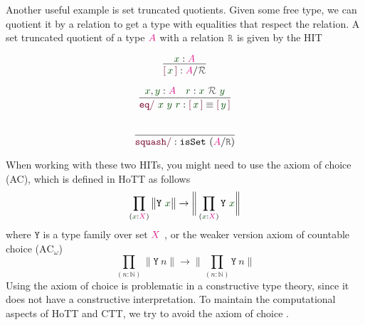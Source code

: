 \documentclass[twoside,11pt,openright]{report}
\theoremstyle{plain} %
\theoremstyle{definition}
\theoremstyle{remark}
\newcommand*{\term}[1]{\textcolor{green!30!black}{#1}} %
\newcommand*{\type}[1]{\textcolor{magenta!90!black}{#1}}
\newcommand*{\relation}[1]{\textcolor{gray!75!black}{\ensuremath{\mathtt{#1}}}}
\newcommand*{\constructor}[1]{\textcolor{purple!60!black}{\ensuremath{\mathtt{#1}}}}
\newcommand*{\typeformer}[1]{\ensuremath{\mathtt{#1}}}
\newcommand*{\quotientconstructor}[1]{\constructor{[}\,#1\,\constructor{]}}
\begin{document}
Another useful example is set truncated quotients. Given some free type, we can quotient it by a relation to get a type with equalities that respect the relation. A set truncated quotient of a type \(\type{A}\) with a relation \(\relation{R}\) is given by the HIT  \\[-10mm]
\begin{center}
  \strut
  \hfill
  \begin{minipage}[b]{0.2\linewidth}
    \begin{equation}
      \vcenter{\infer{\quotientconstructor{\term{x}} : \type{A} / \relation{\mathcal{R}}}{\term{x} : \type{A}}}
    \end{equation}
  \end{minipage}
  \hfill
  \begin{minipage}[b]{0.325\linewidth}
    \begin{equation}
      \vcenter{\infer{\constructor{eq/}~\term{x}~\term{y}~\term{r} : \quotientconstructor{\term{x}} \equiv \quotientconstructor{\term{y}}}{\term{x}, \term{y} : \type{A} & \term{r} : \term{x}~\relation{\mathcal{R}}~\term{y}}}
    \end{equation}
  \end{minipage}
  \hfill
  \begin{minipage}[b]{0.325\linewidth}
    \begin{equation}
      \vcenter{\infer{\constructor{squash/} :\texttt{isSet}~(\type{A} / \relation{R})}{\strut}}
    \end{equation}
  \end{minipage}
  \hfill
  \strut
\end{center}
When working with these two HITs, you might need to use the axiom of choice (AC), which is defined in HoTT as follows
\begin{equation}
  \prod_{(\term{x} : \type{X})} \big\| \typeformer{Y}~\term{x} \big\| \rightarrow \bigg\| \prod_{(\term{x} : \type{X})} \typeformer{Y}~\term{x} \bigg\|
\end{equation}
where \(\typeformer{Y}\) is a type family over set \(\type{X}\) \cite[Section 3.8]{hottbook}, or the weaker version axiom of countable choice (\(\text{AC}_{\omega}\))
\begin{equation}
  \prod_{(n : \mathbb{N})} \big\| \typeformer{Y}~n \big\| \rightarrow \bigg\| \prod_{(n : \mathbb{N})} \typeformer{Y}~n \bigg\|  
\end{equation}
Using the axiom of choice is problematic in a constructive type theory, since it does not have a constructive interpretation. To maintain the computational aspects of HoTT and CTT, we try to avoid the axiom of choice \cite[Introduction]{hottbook}.
\end{document}
